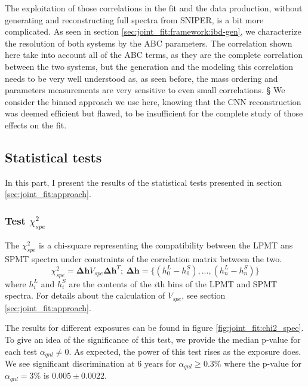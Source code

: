 \documentclass[../main.tex]{subfiles}
\begin{document}
The exploitation of those correlations in the fit and the data production, without generating and reconstructing full spectra from SNIPER, is a bit more complicated. As seen in section \ref{sec:joint_fit:framework:ibd-gen}, we characterize the resolution of both systems by the ABC parameters. The correlation shown here take into account all of the ABC terms, as they are the complete correlation between the two systems, but the generation and the modeling this correlation needs to be very well understood as, as seen before, the mass ordering and parameters measurements are very sensitive to even small correlations.
§
We consider the binned approach we use here, knowing that the CNN reconstruction was deemed efficient but flawed, to be insufficient for the complete study of those effects on the fit.

\subsection{Statistical tests}

In this part, I present the results of the statistical tests presented in section \ref{sec:joint_fit:approach}.

\subsubsection{Test $\chi^2_{spe}$}

The $\chi^2_{spe}$ is a chi-square representing the compatibility between the LPMT ans SPMT spectra under constraints of the correlation matrix between the two.
\begin{equation}
  \chi^2_{spe} = \bm{\Delta h} V_{spe} \bm{\Delta h}^T; ~ \bm{\Delta h} = \{ (h_0^L - h_0^S), ..., (h_n^L - h_n^S) \}
\end{equation}
where $h_i^L$ and $h_i^S$ are the contents of the $i$th bins of the LPMT and SPMT spectra. For details about the calculation of $V_{spe}$, see section \ref{sec:joint_fit:approach}.

The results for different exposures can be found in figure \ref{fig:joint_fit:chi2_spec}. To give an idea of the significance of this test, we provide the median p-value for each test $\alpha_{qnl} \neq 0$. As expected, the power of this test rises as the exposure does. We see significant discrimination at 6 years for $\alpha_{qnl} \geq 0.3 \%$ where the p-value for $\alpha_{qnl} = 3\%$ is $0.005 \pm 0.0022$.
\end{document}
